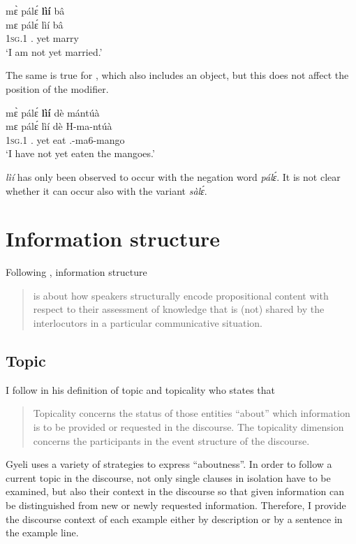 \ea \label{lii1}
  \glll  mɛ̀ pálɛ́ {\bfseries lìí} bâ \\
          mɛ pálɛ́ lìí bâ \\
           1\textsc{sg}.{\PST}1 {\NEG}.{\PST} yet marry\\
    \trans `I am not yet married.'
\z

\noindent The same is true for , which also includes an object, but this does not affect the position of the modifier.

\ea \label{lii2}
  \glll  mɛ̀ pálɛ́ {\bfseries lìí} dè mántúà \\
          mɛ pálɛ́ lìí dè H-ma-ntúà \\
           1\textsc{sg}.{\PST}1 {\NEG}.{\PST} yet eat {\OBJ}.{\LINK}-ma6-mango\\
    \trans `I have not yet eaten the mangoes.'
\z

{\itshape lìí} has only been observed to occur with the negation word {\itshape pálɛ́}. It is not clear whether it can occur also with the variant {\itshape sàlɛ́}.



\section{Information structure}
\label{sec:IS}

Following \citet[156]{guldemann2015}, information structure 
\begin{quote}
is about how speakers structurally encode propositional content with respect to their assessment of knowledge that is (not) shared by the interlocutors in a particular communicative situation.
\end{quote}


\subsection*{Topic}
I follow \citet[312]{dik97} in his definition of topic and topicality who states that
\begin{quote}
Topicality concerns the status of those entities ``about'' which information is to be provided or requested in the discourse. The topicality dimension concerns the participants in the event structure of the discourse.
\end{quote}
Gyeli uses a variety of strategies to express ``aboutness''. In order to follow a current topic in the discourse, not only single clauses in isolation have to be examined, but also their context in the discourse so that given information can be distinguished from new or newly requested information. Therefore, I provide the discourse context of each example either by description or by a sentence in the example line.


